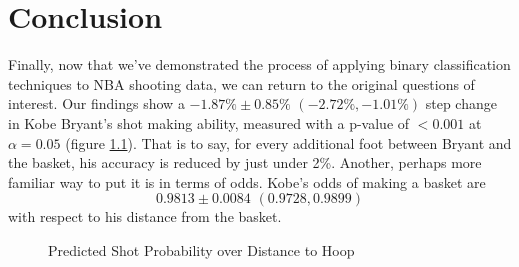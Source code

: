 \chapter{Conclusion}\label{chap:conclusion}

\par
\indent Finally, now that we've demonstrated the process of applying binary classification techniques to NBA shooting data, we can return to the original questions of interest.  Our findings show a $ -1.87 \% \pm  0.85 \%\,\,  (-2.72 \%, -1.01 \%) $ step change in Kobe Bryant's shot making ability, measured with a p-value of $< 0.001$ at $\alpha = 0.05$ (figure \ref{fig:plotproba}). That is to say, for every additional foot between Bryant and the basket, his accuracy is reduced by just under 2\%.  Another, perhaps more familiar way to put it is in terms of odds. Kobe's odds of making a basket are $$ 0.9813 \pm 0.0084   \,\, (0.9728 , 0.9899 )  $$ with respect to his distance from the basket.


\vskip 1cm
    \begin{figure}
    \caption{\label{fig:plotproba} Predicted Shot Probability over Distance to Hoop}
\end{figure}
\vskip 1cm

